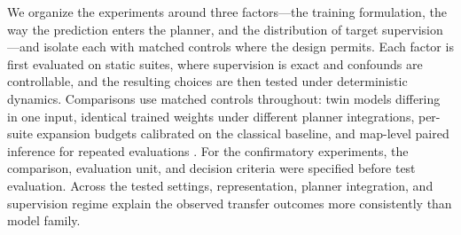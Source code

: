 \documentclass[letterpaper]{article} %
\begin{document}
We organize the experiments around three factors---the training formulation, the way the prediction enters the planner, and the distribution of target supervision---and isolate each with matched controls where the design permits. Each factor is first evaluated on static suites, where supervision is exact and confounds are controllable, and the resulting choices are then tested under deterministic dynamics. Comparisons use matched controls throughout: twin models differing in one input, identical trained weights under different planner integrations, per-suite expansion budgets calibrated on the classical baseline, and map-level paired inference for repeated evaluations \citep{henderson2018matters,agarwal2021precipice,pineau2021reproducibility}. For the confirmatory experiments, the comparison, evaluation unit, and decision criteria were specified before test evaluation. Across the tested settings, representation, planner integration, and supervision regime explain the observed transfer outcomes more consistently than model family.
\end{document}
